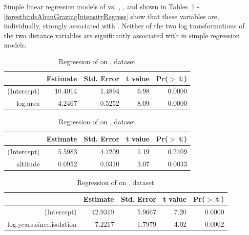 \normalsize

Simple linear regression models of  vs. , ,  and  shown in Tables~\ref{forestbirdsAbunLogAreaRegress} - \ref{forestbirdsAbunGrazingIntensityRegress} show that these variables are, individually, strongly associated with .  Neither of the two log transformations of the two distance variables are significantly associated with  in simple regression models.

\begin{table}[ht]
\centering
\begin{tabular}{rrrrr}
  \hline
 & Estimate & Std. Error & t value & Pr($>$$|$t$|$) \\ 
  \hline
(Intercept) & 10.4014 & 1.4894 & 6.98 & 0.0000 \\ 
  log.area & 4.2467 & 0.5252 & 8.09 & 0.0000 \\ 
   \hline
\end{tabular}
\caption{Regression of  on , dataset }
\label{forestbirdsAbunLogAreaRegress}
\end{table}


\begin{table}[ht]
\centering
\begin{tabular}{rrrrr}
  \hline
 & Estimate & Std. Error & t value & Pr($>$$|$t$|$) \\ 
  \hline
(Intercept) & 5.5983 & 4.7209 & 1.19 & 0.2409 \\ 
  altitude & 0.0952 & 0.0310 & 3.07 & 0.0033 \\ 
   \hline
\end{tabular}
\caption{Regression of  on , dataset }
\label{forestbirdsAbunAltitudeRegress}
\end{table}

\begin{table}[ht]
\centering
\begin{tabular}{rrrrr}
  \hline
 & Estimate & Std. Error & t value & Pr($>$$|$t$|$) \\ 
  \hline
(Intercept) & 42.9319 & 5.9667 & 7.20 & 0.0000 \\ 
  log.years.since.isolation & -7.2217 & 1.7979 & -4.02 & 0.0002 \\ 
   \hline
\end{tabular}
\caption{Regression of  on , dataset }
\label{orestbirdsAbunIsolationRegress}
\end{table}

